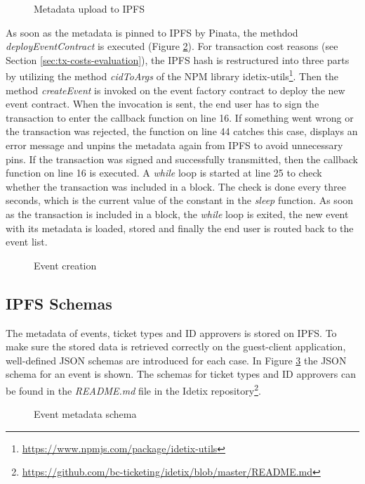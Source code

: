 \begin{figure}[H]
    
    \caption{Metadata upload to IPFS}
    \label{code:upload-metadata}
\end{figure}

As soon as the metadata is pinned to IPFS by Pinata, the methdod \textit{deployEventContract} is executed (Figure \ref{code:create-event}). For transaction cost reasons (see Section \ref{sec:tx-costs-evaluation}), the IPFS hash is restructured into three parts by utilizing the method \textit{cidToArgs} of the NPM library idetix-utils\footnote{\href{https://www.npmjs.com/package/idetix-utils}{https://www.npmjs.com/package/idetix-utils}}. Then the method \textit{createEvent} is invoked on the event factory contract to deploy the new event contract. When the invocation is sent, the end user has to sign the transaction to enter the callback function on line 16. If something went wrong or the transaction was rejected, the function on line 44 catches this case, displays an error message and unpins the metadata again from IPFS to avoid unnecessary pins. If the transaction was signed and successfully transmitted, then the callback function on line 16 is executed. A \textit{while} loop is started at line 25 to check whether the transaction was included in a block. The check is done every three seconds, which is the current value of the constant in the \textit{sleep} function. As soon as the transaction is included in a block, the \textit{while} loop is exited, the new event with its metadata is loaded, stored and finally the end user is routed back to the event list.

\begin{figure}[H]
    
    \caption{Event creation}
    \label{code:create-event}
\end{figure}

\subsection{IPFS Schemas}\label{subsection:ipfs-schema}

The metadata of events, ticket types and ID approvers is stored on IPFS. To make sure the stored data is retrieved correctly on the guest-client application, well-defined JSON schemas are introduced for each case. In Figure \ref{code:event-metadata-schema} the JSON schema for an event is shown. The schemas for ticket types and ID approvers can be found in the \textit{README.md} file in the Idetix repository\footnote{\href{https://github.com/bc-ticketing/idetix/blob/master/README.md}{https://github.com/bc-ticketing/idetix/blob/master/README.md}}.

\begin{figure}[H]
    
    \caption{Event metadata schema}
    \label{code:event-metadata-schema}
\end{figure}
